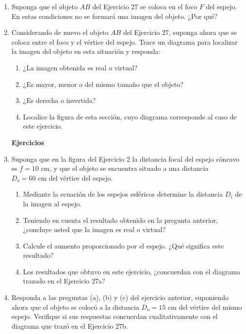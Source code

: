 \documentclass[a4paper, amsfonts, amssymb, amsmath, reprint, showkeys, nofootinbib, twoside]{revtex4-1}
\begin{document}
\begin{enumerate}[start=1, label=\textbf{\arabic*.}]
    \item Suponga que el objeto $AB$ del Ejercicio 27 se coloca en el foco $F$ del espejo. En estas condiciones no se formará una imagen del objeto. ¿Por qué?

    \item Considerando de nuevo el objeto $AB$ del Ejercicio 27, suponga ahora que se coloca entre el foco y el vértice del espejo. Trace un diagrama para localizar la imagen del objeto en esta situación y responda:
          \begin{enumerate}[label=\emph{\alph*)}]
              \item ¿La imagen obtenida es real o virtual?
              \item ¿Es mayor, menor o del mismo tamaño que el objeto?
              \item ¿Es derecha o invertida?
              \item Localice la figura de esta sección, cuyo diagrama corresponde al caso de este ejercicio.
          \end{enumerate}
          \begin{center}
              {\Large \bf Ejercicios}
          \end{center}

    \item Suponga que en la figura del Ejercicio 2 la distancia focal del espejo cóncavo es $f = 10 \text{ cm}$, y que el objeto se encuentra situado a una distancia $D_o = 60 \text{ cm}$ del vértice del espejo.
          \begin{enumerate}[label=\emph{\alph*})]
              \item Mediante la ecuación de los espejos esféricos determine la distancia $D_i$ de la imagen al espejo.
              \item Teniendo en cuenta el resultado obtenido en la pregunta anterior, ¿concluye usted que la imagen es real o virtual?
              \item Calcule el aumento proporcionado por el espejo. ¿Qué significa este resultado?
              \item Los resultados que obtuvo en este ejercicio, ¿concuerdan con el diagrama trazado en el Ejercicio 27a?
          \end{enumerate}

    \item Responda a las preguntas (a), (b) y (c) del ejercicio anterior, suponiendo ahora que el objeto se colocó a la distancia $D_o = 15 \text{ cm}$ del vértice del mismo espejo. Verifique si sus respuestas concuerdan cualitativamente con el diagrama que trazó en el Ejercicio 27b.


\end{enumerate}
\end{document}
